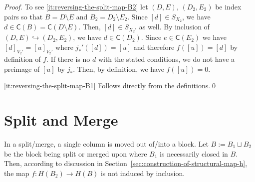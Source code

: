 \documentclass[letterpaper,11pt]{article}
\theoremstyle{plain}
\theoremstyle{definition}
\renewcommand{\emptyset}{\varnothing}
\renewcommand{\emptyset}{\varnothing}
\newcounter{li}
\newcommand{\Zgroup}{\mathsf{Z}}
\newcommand{\Cgroup}{\mathsf{C}}
\newcommand\michal[1]{\textcolor{ForestGreen}{[ML: #1]}}
\newcommand\todo[1]{\textcolor{red}{[TODO: #1]}}
\begin{document}
\begin{proof}
    To see \ref{it:reversing-the-split-map-B2} 
    let $(D,E)$, $(D_2,E_2)$ be index pairs so that $B=D\setminus E$ and $B_2=D_2\setminus E_2$. Since $[d]\in S_{X_2}$, we have $d\in\Cgroup(B)=\Cgroup(D\setminus E)$. Then, $[d]\in S_{X_2'}$ as well.
    By inclusion of $(D,E)\hookrightarrow (D_2,E_2)$, we have $d\in \Cgroup(D_2)$.
    Since $e\in \Cgroup(E_2)$ we have $[d]_{V_2'}=[u]_{V_2'}$ where
    $j_\ast'([d])=[u]$ and therefore $f([u])=[d]$ by definition of $f$. If there
    is no $d$ with the stated conditions, we do not have a preimage
    of $[u]$ by $j_\ast$. Then, by definition, we have $f([u])=0$.
    


    \ref{it:reversing-the-split-map-B1} 
    Follows directly from the definitions.\qed
    
    
\end{proof}


\section{Split and Merge}\label{sec:split-and-merge}
In a split/merge, a single column is moved out of/into a block.
Let $B:=B_1\sqcup B_2$ be the block being split or merged upon where $B_1$ is necessarily closed in $B$.
Then, according to discussion in Section~\ref{sec:construction-of-structural-map-h}, 
the map $f: H(B_2)\rightarrow H(B)$ is not induced
by inclusion.
\end{document}
